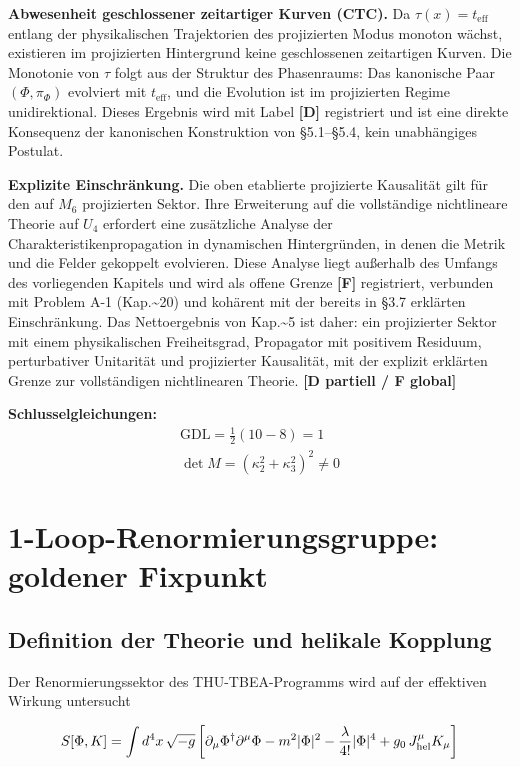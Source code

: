 ﻿\documentclass[11pt,letterpaper]{article}
\begin{document}
\textbf{Abwesenheit geschlossener zeitartiger Kurven (CTC).} Da $\tau(x) = t_{\text{eff}}$ entlang der physikalischen Trajektorien des projizierten Modus monoton wächst, existieren im projizierten Hintergrund keine geschlossenen zeitartigen Kurven. Die Monotonie von $\tau$ folgt aus der Struktur des Phasenraums: Das kanonische Paar $(\Phi, \pi_\Phi)$ evolviert mit $t_{\text{eff}}$, und die Evolution ist im projizierten Regime unidirektional. Dieses Ergebnis wird mit Label \textbf{[D]} registriert und ist eine direkte Konsequenz der kanonischen Konstruktion von §5.1--§5.4, kein unabhängiges Postulat.

\textbf{Explizite Einschränkung.} Die oben etablierte projizierte Kausalität gilt für den auf $M_6$ projizierten Sektor. Ihre Erweiterung auf die vollständige nichtlineare Theorie auf $U_4$ erfordert eine zusätzliche Analyse der Charakteristikenpropagation in dynamischen Hintergründen, in denen die Metrik und die Felder gekoppelt evolvieren. Diese Analyse liegt außerhalb des Umfangs des vorliegenden Kapitels und wird als offene Grenze \textbf{[F]} registriert, verbunden mit Problem A-1 (Kap.\textasciitilde{}20) und kohärent mit der bereits in §3.7 erklärten Einschränkung. Das Nettoergebnis von Kap.\textasciitilde{}5 ist daher: ein projizierter Sektor mit einem physikalischen Freiheitsgrad, Propagator mit positivem Residuum, perturbativer Unitarität und projizierter Kausalität, mit der explizit erklärten Grenze zur vollständigen nichtlinearen Theorie. \textbf{[D partiell / F global]}

\textbf{Schlusselgleichungen:}
\begin{align*}
    \mathrm{GDL} = \frac{1}{2}(10-8) = 1 \\
    \det M = (\kappa_2^2+\kappa_3^2)^2 \neq 0
\end{align*}
\section{1-Loop-Renormierungsgruppe: goldener Fixpunkt}
\subsection{Definition der Theorie und helikale Kopplung}
Der Renormierungssektor des THU-TBEA-Programms wird auf der effektiven Wirkung untersucht

\begin{equation*}
  \resizebox{\ifdim\width>\linewidth \linewidth\else\width\fi}{!}{$\displaystyle S[\Phi, K] = \int d^4x\,\sqrt{-g}\left[\partial_\mu \Phi^\dagger \partial^\mu \Phi - m^2 |\Phi|^2 - \frac{\lambda}{4!}|\Phi|^4 + g_0\, J_{\text{hel}}^\mu K_\mu\right]$}
\end{equation*}
\end{document}
